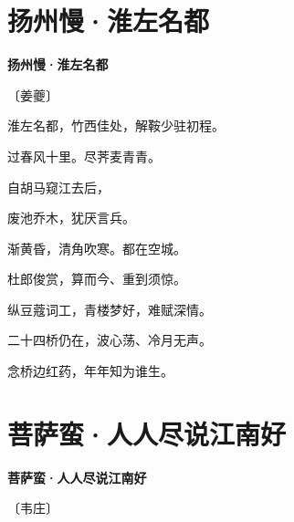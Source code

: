 \documentclass[12pt,UTF-8,openany,fontset=none]{ctexbook}
\begin{document}
\section{扬州慢·淮左名都}


\begin{center}
    {\bfseries 扬州慢·淮左名都}

    \vspace{18pt}

    \begin{large}\xuwen
        〔姜夔〕
    \end{large}

\end{center}

    \vspace{18pt}  %

\begin{center}
    \begin{Large}

        淮左名都，竹西佳处，解鞍少驻初程。

        过春风十里。尽荠麦青青。

        自胡马窥江去后，

        废池乔木，犹厌言兵。

        渐黄昏，清角吹寒。都在空城。

        \vspace{18pt}  %

        杜郎俊赏，算而今、重到须惊。

        纵豆蔻词工，青楼梦好，难赋深情。

        二十四桥仍在，波心荡、冷月无声。

        念桥边红药，年年知为谁生。

    \end{Large}

\end{center}

\vspace{8pt}
\clearpage

\section{菩萨蛮·人人尽说江南好}


\begin{center}
    {\bfseries 菩萨蛮·人人尽说江南好}

    \vspace{18pt}

    \begin{large}\xuwen
        〔韦庄〕
    \end{large}

\end{center}
\end{document}

